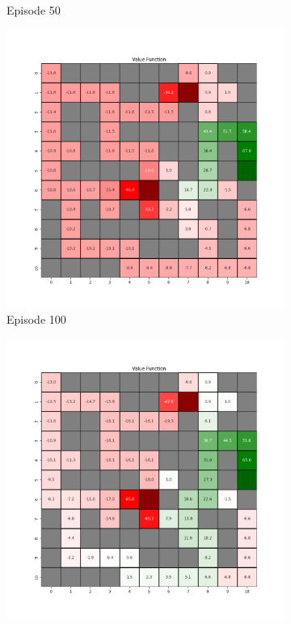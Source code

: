 \documentclass{assignment}
\begin{document}
\begin{figure}[H]
\begin{subfigure}{0.3\textwidth}
    \caption{Episode 50}
    \end{subfigure}\hfill
    \begin{subfigure}{0.3\textwidth}
        \includegraphics[width=\textwidth]{figures/value_td/epsilon_sweep/value_function_alpha_0.1_gamma_0.95_epsilon_0.0_iteration_100.png}
    \caption{Episode 100}
    \end{subfigure}
    \begin{subfigure}{0.3\textwidth}
        \includegraphics[width=\textwidth]{figures/value_td/epsilon_sweep/value_function_alpha_0.1_gamma_0.95_epsilon_0.0_iteration_1000.png}

\end{subfigure}
\end{figure}
\end{document}

